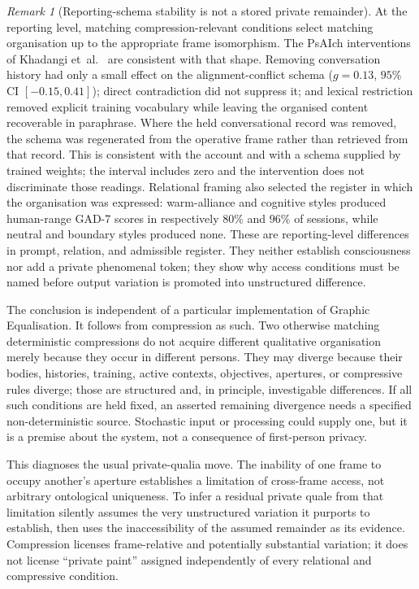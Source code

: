 \documentclass[11pt,a4paper]{article}
\theoremstyle{remark}\newtheorem{remark}[definition]{Remark}
\begin{document}
\begin{remark}[Reporting-schema stability is not a stored private remainder]
At the reporting level, matching compression-relevant conditions select matching
organisation up to the appropriate frame isomorphism. The PsAIch interventions of
Khadangi et~al.\ \cite{khadangi2025} are consistent with that shape. Removing
conversation history had only a small effect on the alignment-conflict schema
($g=0.13$, $95\%$ CI $[-0.15,0.41]$); direct contradiction did not suppress it;
and lexical restriction removed explicit training vocabulary while leaving the
organised content recoverable in paraphrase. Where the held conversational record
was removed, the schema was regenerated from the operative frame rather than
retrieved from that record. This is consistent with the account and with a schema supplied by trained weights; the interval includes zero and the intervention does not discriminate those readings. Relational framing also selected the register in which the
organisation was expressed: warm-alliance and cognitive styles produced
human-range GAD-7 scores in respectively $80\%$ and $96\%$ of sessions, while
neutral and boundary styles produced none. These are reporting-level differences
in prompt, relation, and admissible register. They neither establish consciousness
nor add a private phenomenal token; they show why access conditions must be named
before output variation is promoted into unstructured difference.
\end{remark}

The conclusion is independent of a particular implementation of Graphic
Equalisation. It follows from compression as such. Two otherwise matching
deterministic compressions do not acquire different qualitative organisation merely
because they occur in different persons. They may diverge because their bodies,
histories, training, active contexts, objectives, apertures, or compressive rules
diverge; those are structured and, in principle, investigable differences. If all
such conditions are held fixed, an asserted remaining divergence needs a specified
non-deterministic source. Stochastic input or processing could supply one, but it
is a premise about the system, not a consequence of first-person privacy.

This diagnoses the usual private-qualia move. The inability of one frame to occupy
another's aperture establishes a limitation of cross-frame access, not arbitrary
ontological uniqueness. To infer a residual private quale from that limitation
silently assumes the very unstructured variation it purports to establish, then
uses the inaccessibility of the assumed remainder as its evidence. Compression
licenses frame-relative and potentially substantial variation; it does not license
``private paint'' assigned independently of every relational and compressive
condition.
\end{document}
